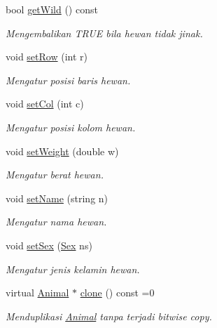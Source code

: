 \begin{DoxyCompactItemize}
bool \hyperlink{classAnimal_ae2db41292da71f0d97f0f14b89e9ca54}{get\+Wild} () const 
\begin{DoxyCompactList}\small\item\em Mengembalikan T\+R\+UE bila hewan tidak jinak. \end{DoxyCompactList}\item 
void \hyperlink{classAnimal_a4b671d61e51b5571b2c970cfbeacec83}{set\+Row} (int r)
\begin{DoxyCompactList}\small\item\em Mengatur posisi baris hewan. \end{DoxyCompactList}\item 
void \hyperlink{classAnimal_a6605290f0ff9a1db578fb11dff721961}{set\+Col} (int c)
\begin{DoxyCompactList}\small\item\em Mengatur posisi kolom hewan. \end{DoxyCompactList}\item 
void \hyperlink{classAnimal_a0472ed25f9cc47d45729dc530088c3ae}{set\+Weight} (double w)
\begin{DoxyCompactList}\small\item\em Mengatur berat hewan. \end{DoxyCompactList}\item 
void \hyperlink{classAnimal_aa26d5b8f6912f03da2cc64ff0b888972}{set\+Name} (string n)
\begin{DoxyCompactList}\small\item\em Mengatur nama hewan. \end{DoxyCompactList}\item 
void \hyperlink{classAnimal_a6ed9f74c98160a980ef0666ecf5f9014}{set\+Sex} (\hyperlink{sex_8h_a2633cb393c68bb2ee8080db58fb7ba93}{Sex} ns)
\begin{DoxyCompactList}\small\item\em Mengatur jenis kelamin hewan. \end{DoxyCompactList}\item 
virtual \hyperlink{classAnimal}{Animal} $\ast$ \hyperlink{classAnimal_a1430e040ea4ff43bc453fa0ad19c308d}{clone} () const =0
\begin{DoxyCompactList}\small\item\em Menduplikasi \hyperlink{classAnimal}{Animal} tanpa terjadi bitwise copy. \end{DoxyCompactList}\end{DoxyCompactItemize}
